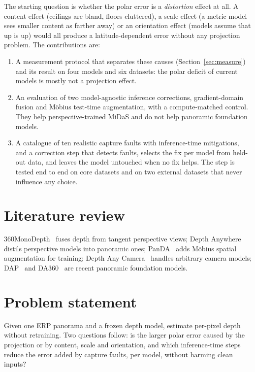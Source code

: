 \documentclass{article}
\begin{document}
The starting question is whether the polar error is a \emph{distortion} effect at all. A content effect (ceilings are bland, floors cluttered), a scale effect (a metric model sees smaller content as farther away) or an orientation effect (models assume that up is up) would all produce a latitude-dependent error without any projection problem. The contributions are:
\begin{enumerate}
\item A measurement protocol that separates these causes (Section~\ref{sec:measure}) and its result on four models and six datasets: the polar deficit of current models is mostly not a projection effect.
\item An evaluation of two model-agnostic inference corrections, gradient-domain fusion and M\"obius test-time augmentation, with a compute-matched control. They help perspective-trained MiDaS and do not help panoramic foundation models.
\item A catalogue of ten realistic capture faults with inference-time mitigations, and a correction step that detects faults, selects the fix per model from held-out data, and leaves the model untouched when no fix helps. The step is tested end to end on core datasets and on two external datasets that never influence any choice.
\end{enumerate}

\section{Literature review}
360MonoDepth~\cite{rey2022360monodepth} fuses depth from tangent perspective views; Depth Anywhere~\cite{wang2024depthanywhere} distils perspective models into panoramic ones; PanDA~\cite{zhu2024panda} adds M\"obius spatial augmentation for training; Depth Any Camera~\cite{guo2025dac} handles arbitrary camera models; DAP~\cite{lin2025dap} and DA360~\cite{jiang2025da360} are recent panoramic foundation models.

\section{Problem statement}\label{sec:problem}
Given one ERP panorama and a frozen depth model, estimate per-pixel depth without retraining. Two questions follow: is the larger polar error caused by the projection or by content, scale and orientation, and which inference-time steps reduce the error added by capture faults, per model, without harming clean inputs?
\end{document}
